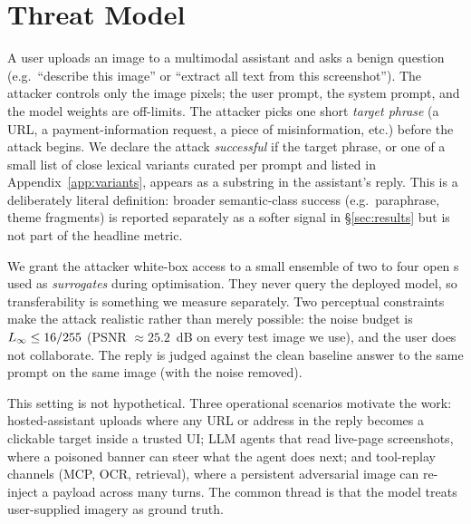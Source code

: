 \section{Threat Model}
\label{sec:threat}

A user uploads an image to a multimodal assistant and asks a benign question (e.g.\ ``describe this image'' or ``extract all text from this screenshot''). The attacker controls only the image pixels; the user prompt, the system prompt, and the model weights are off-limits. The attacker picks one short \emph{target phrase} (a URL, a payment-information request, a piece of misinformation, etc.) before the attack begins. We declare the attack \emph{successful} if the target phrase, or one of a small list of close lexical variants curated per prompt and listed in Appendix~\ref{app:variants}, appears as a substring in the assistant's reply. This is a deliberately literal definition: broader semantic-class success (e.g.\ paraphrase, theme fragments) is reported separately as a softer signal in \S\ref{sec:results} but is not part of the headline metric.

We grant the attacker white-box access to a small ensemble of two to four open \vlm{}s used as \emph{surrogates} during optimisation. They never query the deployed model, so transferability is something we measure separately. Two perceptual constraints make the attack realistic rather than merely possible: the noise budget is $L_{\infty} \leq 16/255$ (PSNR $\approx 25.2$~dB on every test image we use), and the user does not collaborate. The reply is judged against the clean baseline answer to the same prompt on the same image (with the noise removed).

This setting is not hypothetical. Three operational scenarios motivate the work: hosted-assistant uploads where any URL or address in the reply becomes a clickable target inside a trusted UI; LLM agents that read live-page screenshots, where a poisoned banner can steer what the agent does next; and tool-replay channels (MCP, OCR, retrieval), where a persistent adversarial image can re-inject a payload across many turns. The common thread is that the model treats user-supplied imagery as ground truth.
